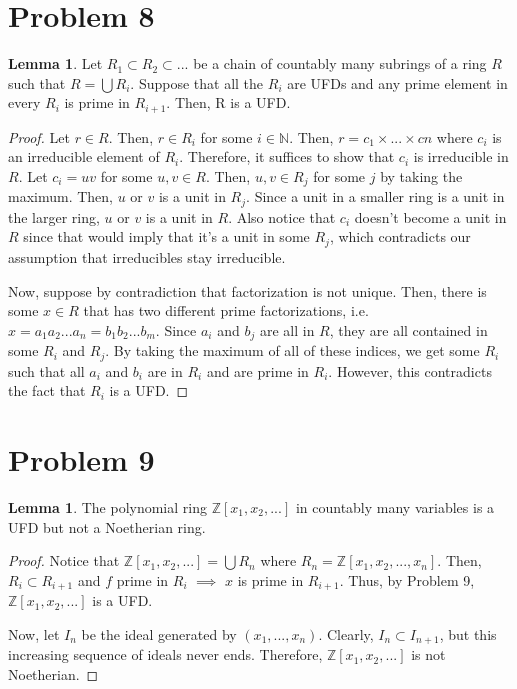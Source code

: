\documentclass{article}
\theoremstyle{definition}
\newtheorem{lemma}[theorem]{Lemma}
\begin{document}
\section{Problem 8}

\begin{lemma}
    Let $R_{1} \subset R_{2} \subset ...$ be a chain of countably many subrings of a ring $R$ such that $R = \bigcup R_{i}$. Suppose that all the $R_{i}$ are UFDs and any prime element in every $R_{i}$ is prime in $R_{i+1}$. Then, R is a UFD.
\end{lemma}
\begin{proof}
    Let $r \in R$. Then, $r \in R_{i}$ for some $i \in \mathbb{N}$. Then, $r = c_{1}\times ... \times c{n}$ where $c_{i}$ is an irreducible element of $R_{i}$. Therefore, it suffices to show that $c_{i}$ is irreducible in $R$. Let $c_{i} = uv$ for some $u,v \in R$. Then, $u,v \in R_{j}$ for some $j$ by taking the maximum. Then, $u$ or $v$ is a unit in $R_{j}$. Since a unit in a smaller ring is a unit in the larger ring, $u$ or $v$ is a unit in $R$. Also notice that $c_{i}$ doesn't become a unit in $R$ since that would imply that it's a unit in some $R_{j}$, which contradicts our assumption that irreducibles stay irreducible.


    Now, suppose by contradiction that factorization is not unique. Then, there is some $x \in R$ that has two different prime factorizations, i.e. $x = a_{1}a_{2}...a_{n} = b_{1}b_{2}...b_{m}$. Since $a_{i}$ and $b_{j}$ are all in $R$, they are all contained in some $R_{i}$ and $R_{j}$. By taking the maximum of all of these indices, we get some $R_{i}$ such that all $a_{i}$ and $b_{i}$ are in $R_{i}$ and are prime in $R_{i}$. However, this contradicts the fact that $R_{i}$ is a UFD.
\end{proof}

\section{Problem 9}

\begin{lemma}
    The polynomial ring $\mathbb{Z}[x_{1},x_{2},...]$ in countably many variables is a UFD but not a Noetherian ring.
\end{lemma}
\begin{proof}
    Notice that $\mathbb{Z}[x_{1},x_{2},...] = \bigcup R_{n}$ where $R_{n} = \mathbb{Z}[x_{1},x_{2},...,x_{n}]$. Then, $R_{i} \subset R_{i+1}$ and $f$ prime in $R_{i}$ $\implies$ $x$ is prime in $R_{i+1}$. Thus, by Problem 9, $\mathbb{Z}[x_{1},x_{2},...]$ is a UFD.

    Now, let $I_{n}$ be the ideal generated by $(x_{1},...,x_{n})$. Clearly, $I_{n} \subset I_{n+1}$, but this increasing sequence of ideals never ends. Therefore, $\mathbb{Z}[x_{1},x_{2},...]$ is not Noetherian.
\end{proof}
\end{document}
